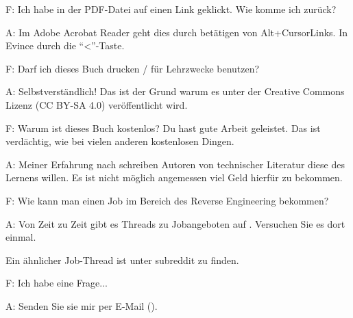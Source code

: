 \par F: Ich habe in der PDF-Datei auf einen Link geklickt. Wie komme ich zurück?
\par A: Im Adobe Acrobat Reader geht dies durch betätigen von Alt+CursorLinks.
In Evince durch die ``<''-Taste.

\par F: Darf ich dieses Buch drucken / für Lehrzwecke benutzen?
\par A: Selbstverständlich! Das ist der Grund warum es unter der Creative Commons Lizenz (CC BY-SA 4.0) veröffentlicht wird.

\par F: Warum ist dieses Buch kostenlos? Du hast gute Arbeit geleistet. Das ist verdächtig, wie bei vielen anderen kostenlosen Dingen.
\par A: Meiner Erfahrung nach schreiben Autoren von technischer Literatur diese des Lernens willen. Es ist nicht möglich angemessen
viel Geld hierfür zu bekommen.

\par F: Wie kann man einen Job im Bereich des Reverse Engineering bekommen?
\par A: Von Zeit zu Zeit gibt es Threads zu Jobangeboten auf \FNURLREDDIT{}.
Versuchen Sie es dort einmal.

Ein ähnlicher Job-Thread ist unter subreddit zu finden.


\par F: Ich habe eine Frage...
\par A: Senden Sie sie mir per E-Mail (\EMAIL).
